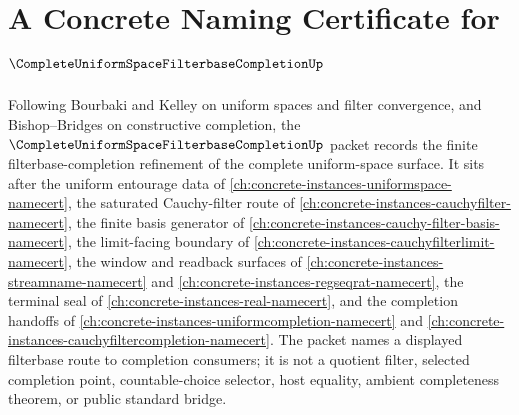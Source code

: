 \chapter{A Concrete Naming Certificate for $\CompleteUniformSpaceFilterbaseCompletionUp$}
\label{ch:concrete-instances-complete-uniform-space-filterbase-completion-namecert}

Following Bourbaki and Kelley on uniform spaces and filter convergence, and Bishop--Bridges on constructive completion, the $\CompleteUniformSpaceFilterbaseCompletionUp$ packet records the finite filterbase-completion refinement of the complete uniform-space surface. It sits after the uniform entourage data of \autoref{ch:concrete-instances-uniformspace-namecert}, the saturated Cauchy-filter route of \autoref{ch:concrete-instances-cauchyfilter-namecert}, the finite basis generator of \autoref{ch:concrete-instances-cauchy-filter-basis-namecert}, the limit-facing boundary of \autoref{ch:concrete-instances-cauchyfilterlimit-namecert}, the window and readback surfaces of \autoref{ch:concrete-instances-streamname-namecert} and \autoref{ch:concrete-instances-regseqrat-namecert}, the terminal seal of \autoref{ch:concrete-instances-real-namecert}, and the completion handoffs of \autoref{ch:concrete-instances-uniformcompletion-namecert} and \autoref{ch:concrete-instances-cauchyfiltercompletion-namecert}. The packet names a displayed filterbase route to completion consumers; it is not a quotient filter, selected completion point, countable-choice selector, host equality, ambient completeness theorem, or public standard bridge.

